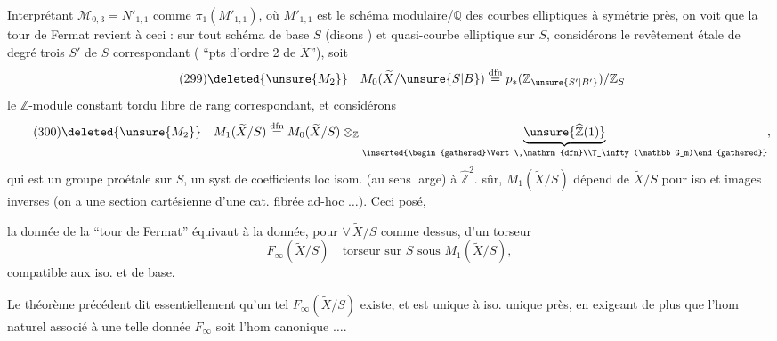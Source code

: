 Interprétant $\mathcal M_{0,3}=N'_{1,1}$ comme $\pi_1(M'_{1,1})$, où $M'_{1,1}$ est le schéma modulaire/$\mathbb Q$ des courbes elliptiques à symétrie près, on voit que la tour de Fermat revient à ceci : sur tout schéma de base $S$ (disons ) et  quasi-courbe elliptique  sur $S$, considérons le revêtement étale de degré trois $S'$ de $S$ correspondant ( ``pts d'ordre 2 de $\widetilde X$''),  soit
\[
\tag{299}
\deleted{\unsure{M_2}}\quad M_0(\widetilde X/\unsure{S|B})\overset{\mathrm{dfn}}{=}p_*(\mathbb Z_{\unsure{S'|B'}})/\mathbb Z_S
\]
le $\mathbb Z$-module constant tordu libre de rang  correspondant, et considérons
\[
\tag{300}
\deleted{\unsure{M_2}}\quad M_1(\widetilde X/S)\overset{\mathrm{dfn}}{=}M_0(\widetilde X/S)\otimes_{\mathbb Z}\underbrace{\unsure{\widehat{\mathbb Z}(1)}}_{\inserted{\begin{gathered}\Vert\,\mathrm{dfn}\\T_\infty(\mathbb G_m)\end{gathered}}},
\]
qui est un groupe proétale sur $S$, un syst de coefficients loc isom. (au sens large) à $\widehat{\mathbb Z}^{2}$.  sûr, $M_1(\widetilde X/S)$ dépend  de $\widetilde X/S$ pour iso et images inverses (on a une section cartésienne d'une cat. fibrée ad-hoc $\ldots$). Ceci posé,



la donnée de la ``tour de Fermat'' équivaut à la donnée, pour $\forall\,\widetilde X/S$ comme dessus, d'un torseur
\[
\tag{301}
F_\infty(\widetilde X/S)\quad\text{torseur sur }S\text{ sous }M_1(\widetilde X/S),
\]
compatible aux iso. et  de base.

Le théorème précédent dit essentiellement qu'un tel $F_\infty(\widetilde X/S)$ existe, et est unique à iso. unique près, en exigeant de plus que l'hom naturel
associé à une telle donnée $F_\infty$ soit l'hom canonique $\ldots$.

